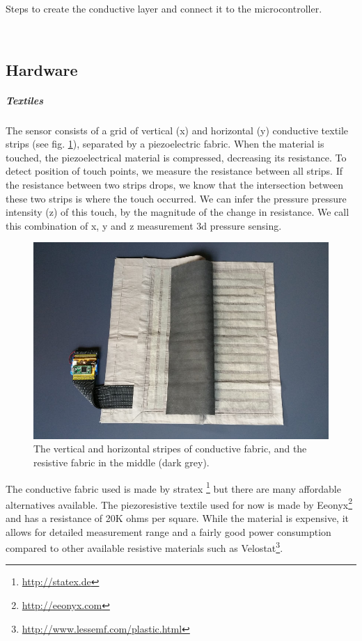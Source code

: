 \documentclass{sigchi-ext}
\begin{document}
\begin{marginfigure}[-39ex]
\begin{minipage}{\marginparwidth}
    \caption{Steps to create the conductive layer and connect it to the microcontroller.}~\label{fig:tutorial}
  \end{minipage}
\end{marginfigure}

\subsection{Hardware}
\subparagraph{Textiles}
The sensor consists of a grid of vertical (x) and horizontal (y) conductive textile strips (see fig. \ref{fig:inside}), separated by a piezoelectric fabric. When the material is touched, the piezoelectrical material is compressed, decreasing its resistance.
To detect position of touch points, we measure the resistance between all strips. If the resistance between two strips drops, we know that the intersection between these two strips is where the touch occurred. We can infer the pressure pressure intensity (z) of this touch, by the magnitude of the change in resistance. We call this combination of x, y and z measurement 3d pressure sensing.

\begin{figure}[!h]
    \centering
    \includegraphics[width=\columnwidth]{figures/inside}
    \caption{The vertical and horizontal stripes of conductive fabric,
    and the resistive fabric in the middle (dark grey).}\label{fig:inside}
\end{figure}

The conductive fabric used is made by stratex \footnote{\url{http://statex.de}} but there are many affordable alternatives available.
The piezoresistive textile used for now is made by Eeonyx\footnote{\url{http://eeonyx.com}} and has a resistance of 20K ohms per square. While the material is expensive, it allows for detailed measurement range and a fairly good power consumption compared to other available resistive materials such as Velostat\footnote{\url{http://www.lessemf.com/plastic.html}}.
\end{document}
